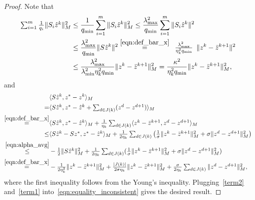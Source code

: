 {\begin{proof}
Note that
\begin{equation}\label{term2}
\begin{aligned}
\textstyle\sum_{i=1}^m\frac{1}{q_i} \|S_i\hat{z}^{k}\|_M^2&\le\frac{1}{q_{\min}}
\sum_{i=1}^m\|S_i\hat{z}^{k}\|_M^2\leq
\frac{\lambda_{\max}^2}{q_{\min}} \sum_{i=1}^m\|S_i\hat{z}^{k}\|^2\\
&\leq\frac{\lambda_{\max}^2}{q_{\min}}
\|S\hat{z}^{k}\|^2\overset{\eqref{eqn:def_bar_x}}{=}
\begin{array}{l}\frac{\lambda_{\max}^2}{\eta_k^2q_{\min}}\end{array}\|z^k-\bar{z}^{k+1}\|^2
\\&\leq\frac{\lambda_{\max}^2}{\lambda_{\min}^2\eta_k^2q_{\min}}\|z^k-\bar{z}^{k+1}\|_M^2
=\frac{\kappa^2}{\eta_k^2q_{\min}}\|z^k-\bar{z}^{k+1}\|_M^2,
\end{aligned}
\end{equation}
and
\begin{equation}\label{term1}
\begin{aligned}
&\langle S \hat{z}^{k}, z^* - z^k \rangle_M\\
=&\textstyle\langle S \hat{z}^{k},z^* - \hat{z}^k + \sum_{d\in J(k)} (z^{d} -
z^{d+1})\rangle_M\cr \overset{\eqref{eqn:def_bar_x}}=&\textstyle\langle S
\hat{z}^{k}, z^* - \hat{z}^k\rangle_M + \frac{1}{\eta_k}\sum_{d\in J(k)}\langle
z^k-\bar{z}^{k+1}, z^{d} - z^{d+1}\rangle_M\cr \le&\textstyle \langle S
\hat{z}^{k}-Sz^*, z^* - \hat{z}^k\rangle_M+\frac{1}{2\eta_k}\sum_{d\in
J(k)}\big(\frac{1}{\sigma}\|z^k-\bar{z}^{k+1}\|_M^2+ \sigma\|z^{d} -
z^{d+1}\|_M^2\big)\cr \overset{\eqref{eqn:alpha_avg}}\le&\textstyle
-\frac{1}{2}\|S \hat{z}^{k}\|_M^2+\frac{1}{2\eta_k}\sum_{d\in
J(k)}(\frac{1}{\sigma}\|z^k-\bar{z}^{k+1}\|_M^2+ \sigma\|z^{d} -
z^{d+1}\|_M^2)\cr
\overset{\eqref{eqn:def_bar_x}}=&\textstyle-\frac{1}{2\eta_k^2}\|z^k-\bar{z}^{k+1}\|_M^2+
\frac{|J(k)|}{2\sigma\eta_k}\|z^k-\bar{z}^{k+1}\|_M^2+\frac{\sigma}{2\eta_k}\sum_{d\in
J(k)}\|z^{d} - z^{d+1}\|_M^2,
\end{aligned}
\end{equation}
where the first inequality follows from the Young's inequality. Plugging~\eqref{term2} and~\eqref{term1} into~\eqref{eqn:equality_inconsistent} gives the desired result.\hfill\end{proof}

}
